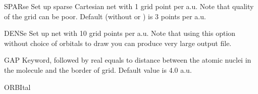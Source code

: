 \begin{keywordlist}
\item[SPARse]
Set up sparse Cartesian net with 1 grid point per a.u.
Note that quality of the grid can be poor.
Default (without  or ) is 3 points per a.u.
\item[DENSe]
Set up net with 10 grid points per a.u. Note that using this option
without choice of orbitals to draw you can produce very large output file.
\item[GAP]
Keyword, followed by real equals to distance between
the atomic nuclei in the molecule and the border of grid.
Default value is 4.0 a.u.
\item[ORBItal]

\end{keywordlist}
